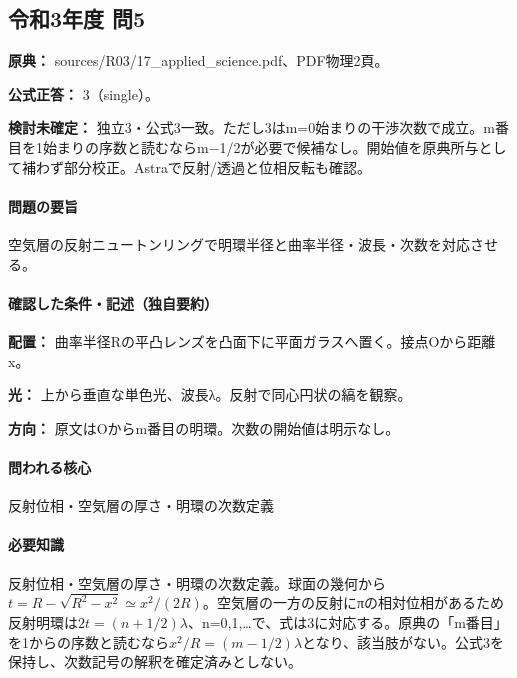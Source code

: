 \subsection{令和3年度 問5}
\label{q:r03-reg-applied-05}

\noindent\textbf{原典：} sources/R03/17\_applied\_science.pdf、PDF物理2頁。

\textbf{公式正答：} 3（single）。

\par\textbf{検討未確定：} 独立3・公式3一致。ただし3はm=\allowbreak{}0始まりの干渉次数で成立。m番目を1始まりの序数と読むならm−1/2が必要で候補なし。開始値を原典所与として補わず部分校正。Astraで反射/透過と位相反転も確認。

\paragraph{問題の要旨} 空気層の反射ニュートンリングで明環半径と曲率半径・波長・次数を対応させる。

\paragraph{確認した条件・記述（独自要約）}\mbox{}\par

\noindent\textbf{配置：} 曲率半径Rの平凸レンズを凸面下に平面ガラスへ置く。接点Oから距離x。\par

\noindent\textbf{光：} 上から垂直な単色光、波長λ。反射で同心円状の縞を観察。\par

\noindent\textbf{方向：} 原文はOからm番目の明環。次数の開始値は明示なし。\par

\paragraph{問われる核心} 反射位相・空気層の厚さ・明環の次数定義

\paragraph{必要知識} 反射位相・空気層の厚さ・明環の次数定義。球面の幾何から\(t=R-\sqrt{R^2-x^2}\simeq x^2/(2R)\)。空気層の一方の反射にπの相対位相があるため反射明環は\(2t=(n+1/2)\lambda\)、n=\allowbreak{}0,1,…で、式は3に対応する。原典の「m番目」を1からの序数と読むなら\(x^2/R=(m-1/2)\lambda\)となり、該当肢がない。公式3を保持し、次数記号の解釈を確定済みとしない。

